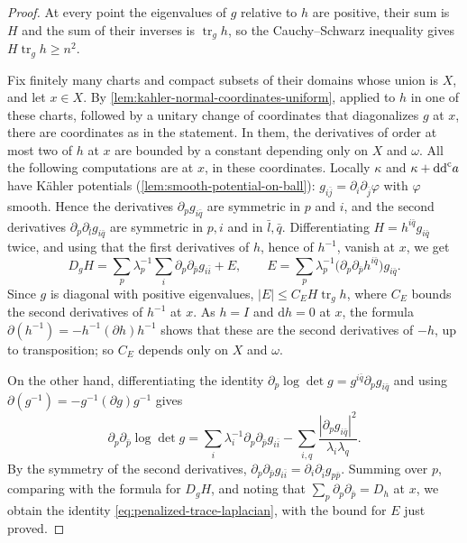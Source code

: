 \begin{proof}
At every point the eigenvalues of $g$ relative to $h$ are positive, their sum is $H$ and the sum of their inverses is $\operatorname{tr}_gh$, so the Cauchy--Schwarz inequality gives $H\operatorname{tr}_gh\geq n^2$.

Fix finitely many charts and compact subsets of their domains whose union is $X$, and let $x\in X$. By \cref{lem:kahler-normal-coordinates-uniform}, applied to $h$ in one of these charts, followed by a unitary change of coordinates that diagonalizes $g$ at $x$, there are coordinates as in the statement. In them, the derivatives of order at most two of $h$ at $x$ are bounded by a constant depending only on $X$ and $\omega$. All the following computations are at $x$, in these coordinates. Locally $\kappa$ and $\kappa+\mathrm{dd}^{\mathrm{c}} a$ have K\"ahler potentials (\cref{lem:smooth-potential-on-ball}): $g_{i\bar j}=\partial_i\partial_{\bar j}\varphi$ with $\varphi$ smooth. Hence the derivatives $\partial_pg_{i\bar q}$ are symmetric in $p$ and $i$, and the second derivatives $\partial_p\partial_{\bar l}g_{i\bar q}$ are symmetric in $p,i$ and in $\bar l,\bar q$. Differentiating $H=h^{i\bar q}g_{i\bar q}$ twice, and using that the first derivatives of $h$, hence of $h^{-1}$, vanish at $x$, we get
\[
 D_gH=\sum_p\lambda_p^{-1}\sum_i\partial_p\partial_{\bar p}g_{i\bar i}+E,
 \qquad E=\sum_p\lambda_p^{-1}\bigl(\partial_p\partial_{\bar p}h^{i\bar q}\bigr)g_{i\bar q}.
\]
Since $g$ is diagonal with positive eigenvalues, $|E|\leq C_EH\operatorname{tr}_gh$, where $C_E$ bounds the second derivatives of $h^{-1}$ at $x$. As $h=I$ and $\mathrm dh=0$ at $x$, the formula $\partial(h^{-1})=-h^{-1}(\partial h)h^{-1}$ shows that these are the second derivatives of $-h$, up to transposition; so $C_E$ depends only on $X$ and $\omega$.

On the other hand, differentiating the identity $\partial_p\log\det g=g^{i\bar q}\partial_pg_{i\bar q}$ and using $\partial(g^{-1})=-g^{-1}(\partial g)g^{-1}$ gives
\[
 \partial_p\partial_{\bar p}\log\det g
 =\sum_i\lambda_i^{-1}\partial_p\partial_{\bar p}g_{i\bar i}
  -\sum_{i,q}\frac{|\partial_pg_{i\bar q}|^2}{\lambda_i\lambda_q}.
\]
By the symmetry of the second derivatives, $\partial_p\partial_{\bar p}g_{i\bar i}=\partial_i\partial_{\bar i}g_{p\bar p}$. Summing over $p$, comparing with the formula for $D_gH$, and noting that $\sum_p\partial_p\partial_{\bar p}=D_h$ at $x$, we obtain the identity \eqref{eq:penalized-trace-laplacian}, with the bound for $E$ just proved.


\end{proof}
